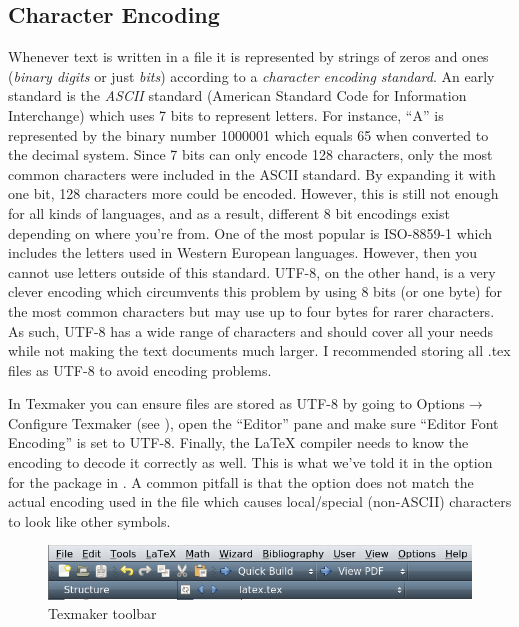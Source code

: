 \subsection{Character Encoding}
Whenever text is written in a file it is represented by strings of zeros and ones (\emph{binary digits} or just \emph{bits}) according to a \emph{character encoding standard}. An early standard is the \emph{ASCII} standard (American Standard Code for Information Interchange) which uses 7 bits to represent letters. For instance, ``A'' is represented by the binary number 1000001 which equals 65 when converted to the decimal system. Since 7 bits can only encode 128 characters, only the most common characters were included in the ASCII standard. By expanding it with one bit, 128 characters more could be encoded. However, this is still not enough for all kinds of languages, and as a result, different 8 bit encodings exist depending on where you're from. One of the most popular is ISO-8859-1 which includes the letters used in Western European languages. However, then you cannot use letters outside of this standard. UTF-8, on the other hand, is a very clever encoding which circumvents this problem by using 8 bits (or one byte) for the most common characters but may use up to four bytes for rarer characters. As such, UTF-8 has a wide range of characters and should cover all your needs while not making the text documents much larger. I recommended storing all .tex files as UTF-8 to avoid encoding problems.

In Texmaker you can ensure files are stored as UTF-8 by going to Options$\rightarrow$ Configure Texmaker (see ), open the ``Editor'' pane and make sure ``Editor Font Encoding'' is set to UTF-8. Finally, the \LaTeX{} compiler needs to know the encoding to decode it correctly as well. This is what we've told it in the option for the  package in . A common pitfall is that the  option does not match the actual encoding used in the file which causes local/special (non-ASCII) characters to look like other symbols.

\begin{figure}
	\centering
	\includegraphics[width=\textwidth]{graphics/texmaker.png}
	\caption{Texmaker toolbar}
	\label{fig:latex:texmaker}
\end{figure}

